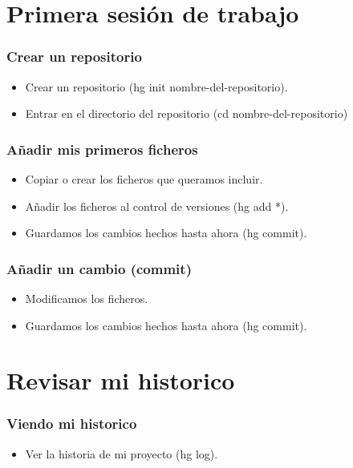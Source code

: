\documentclass[10pt]{beamer}
\begin{document}
  \section*{Primera sesión de trabajo}

  \begin{frame}[containsverbatim]
    \frametitle{Crear un repositorio}
    \begin{itemize}
      \item Crear un repositorio (hg init nombre-del-repositorio).
      \item Entrar en el directorio del repositorio (cd nombre-del-repositorio)
    \end{itemize}
  \end{frame}

  \begin{frame}[containsverbatim]
    \frametitle{Añadir mis primeros ficheros}
    \begin{itemize}
      \item Copiar o crear los ficheros que queramos incluir.
      \item Añadir los ficheros al control de versiones (hg add *).
      \item Guardamos los cambios hechos hasta ahora (hg commit).
    \end{itemize}
  \end{frame}

  \begin{frame}[containsverbatim]
    \frametitle{Añadir un cambio (commit)}
    \begin{itemize}
      \item Modificamos los ficheros.
      \item Guardamos los cambios hechos hasta ahora (hg commit).
    \end{itemize}
  \end{frame}

  \section*{Revisar mi historico}

  \begin{frame}[containsverbatim]
    \frametitle{Viendo mi historico}
    \begin{itemize}
      \item Ver la historia de mi proyecto (hg log).
    \end{itemize}
  \end{frame}
\end{document}
